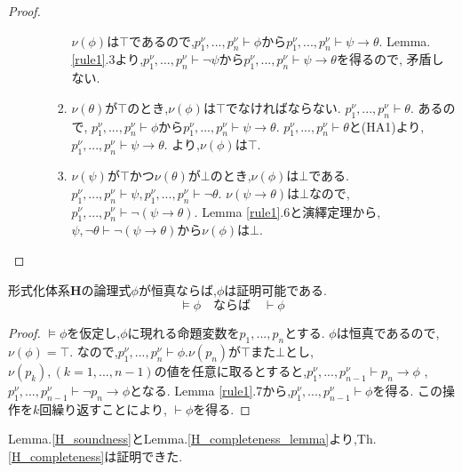 \begin{proof}
\begin{enumerate}
\begin{enumerate}
\begin{enumerate}
					  $\nu(\phi)$は$\top$であるので,$p_1^{\nu},...,p_n^{\nu} \vdash \phi$から$p_1^{\nu},...,p_n^{\nu} \vdash \psi \to \theta$.
					  Lemma.\ref{rule1}.3より,$p_1^{\nu},...,p_n^{\nu} \vdash \lnot \psi$から$p_1^{\nu},...,p_n^{\nu} \vdash \psi \to \theta$を得るので,
					  矛盾しない.
				\item $\nu(\theta)$が$\top$のとき,$\nu(\phi)$は$\top$でなければならない. $p_1^{\nu},...,p_n^{\nu} \vdash \theta$. あるので,
					  $p_1^{\nu},...,p_n^{\nu} \vdash \phi$から$p_1^{\nu},...,p_n^{\nu} \vdash \psi \to \theta$.
					  $p_1^{\nu},...,p_n^{\nu} \vdash \theta$と(HA1)より,$p_1^{\nu},...,p_n^{\nu} \vdash \psi \to \theta$.
					  より,$\nu(\phi)$は$\top$.
				\item $\nu(\psi)$が$\top$かつ$\nu(\theta)$が$\bot$のとき,$\nu(\phi)$は$\bot$である.
					  $p_1^{\nu},...,p_n^{\nu} \vdash \psi, p_1^{\nu},...,p_n^{\nu} \vdash \lnot \theta$.
					  $\nu(\psi \to \theta)$は$\bot$なので,$p_1^{\nu},...,p_n^{\nu} \vdash \lnot (\psi \to \theta)$.
					  Lemma \ref{rule1}.6と演繹定理から,$\psi,\lnot \theta \vdash \lnot (\psi \to \theta)$から$\nu(\phi)$は$\bot$.
			   \end{enumerate}
		\end{enumerate}
 \end{enumerate}
\end{proof}


\begin{lemma}
 \label{H_completeness_lemma}
 形式化体系$\bm{H}$の論理式$\phi$が恒真ならば,$\phi$は証明可能である.
 \begin{equation*}
  \models \phi \quad ならば \quad \vdash \phi
 \end{equation*}
\end{lemma}

\begin{proof}
 $\models \phi$を仮定し,$\phi$に現れる命題変数を$p_1,...,p_n$とする.
$\phi$は恒真であるので, $\nu(\phi)=\top$.
なので,$p_1^{\nu},...,p_n^{\nu} \vdash \phi$.$\nu(p_n)$が$\top$また$\bot$とし,
$\nu(p_k),(k=1,...,n-1)$の値を任意に取るとすると,$p_1^{\nu},...,p_{n-1}^{\nu} \vdash p_n \to \phi$
,$p_1^{\nu},...,p_{n-1}^{\nu} \vdash \lnot p_n \to \phi$となる.
Lemma \ref{rule1}.7から,$p_1^{\nu},...,p_{n-1}^{\nu} \vdash \phi$を得る.
この操作を$k$回繰り返すことにより, $\vdash \phi$を得る.
\end{proof}

Lemma.\ref{H_soundness}とLemma.\ref{H_completeness_lemma}より,Th.\ref{H_completeness}は証明できた.

